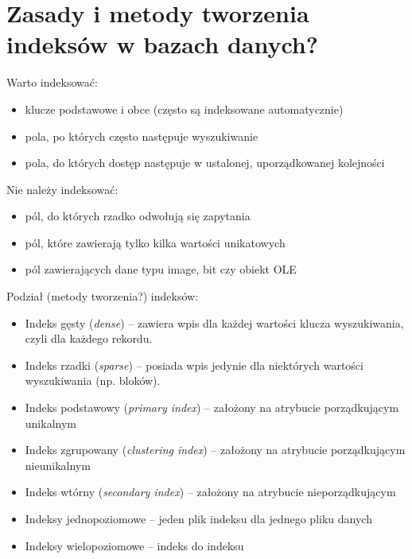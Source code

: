 \documentclass[12pt,a4paper]{article}
\begin{document}
	\section{Zasady i metody tworzenia indeksów w bazach danych?}
	Warto indeksować:
	\begin{itemize}
		\item klucze podstawowe i obce (często są indeksowane automatycznie)
		\item pola, po których często następuje wyszukiwanie
		\item pola, do których dostęp następuje w ustalonej, uporządkowanej kolejności
	\end{itemize}
	Nie należy indeksować:
	\begin{itemize}
		\item pól, do których rzadko odwołują się zapytania
		\item pól, które zawierają tylko kilka wartości unikatowych
		\item pól zawierających dane typu image, bit czy obiekt OLE 
	\end{itemize}
	Podział (metody tworzenia?) indeksów:
	\begin{itemize}
		\item Indeks gęsty (\textit{dense}) – zawiera wpis dla każdej wartości klucza wyszukiwania, czyli dla każdego rekordu.
		\item Indeks rzadki (\textit{sparse}) – posiada wpis jedynie dla niektórych wartości wyszukiwania (np. bloków).
		\item Indeks podstawowy (\textit{primary index}) – założony na atrybucie porządkującym unikalnym
		\item Indeks zgrupowany (\textit{clustering index}) – założony na atrybucie porządkującym nieunikalnym
		\item Indeks wtórny (\textit{secondary index}) – założony na atrybucie nieporządkującym
		\item Indeksy jednopoziomowe – jeden plik indeksu dla jednego pliku danych
		\item Indeksy wielopoziomowe – indeks do indeksu
	\end{itemize}
\end{document}
